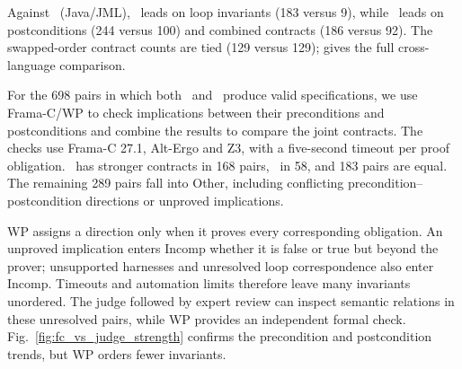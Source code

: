 {Against \specgen\ (Java/JML), \toolname\ leads on loop invariants (183 versus 9), while \specgen\ leads on postconditions (244 versus 100) and combined contracts (186 versus 92). The swapped-order contract counts are tied (129 versus 129);  gives the full cross-language comparison.}

\smallskip
{}
{For the 698 pairs in which both \toolname\ and \autospec\ produce valid specifications, we use Frama-C/WP to check implications between their preconditions and postconditions and combine the results to compare the joint contracts. The checks use Frama-C 27.1, Alt-Ergo and Z3, with a five-second timeout per proof obligation. \toolname\ has stronger contracts in 168 pairs, \autospec\ in 58, and 183 pairs are equal. The remaining 289 pairs fall into Other, including conflicting precondition--postcondition directions or unproved implications.}

{WP assigns a direction only when it proves every corresponding
obligation. An unproved implication enters Incomp whether it is false or true
but beyond the prover; unsupported harnesses and unresolved loop
correspondence also enter Incomp. Timeouts and automation limits therefore
leave many invariants unordered. The judge followed by expert review can
inspect semantic relations in these unresolved pairs, while WP provides an
independent formal check. Fig.~\ref{fig:fc_vs_judge_strength} confirms the
precondition and postcondition trends, but WP orders fewer invariants.}

